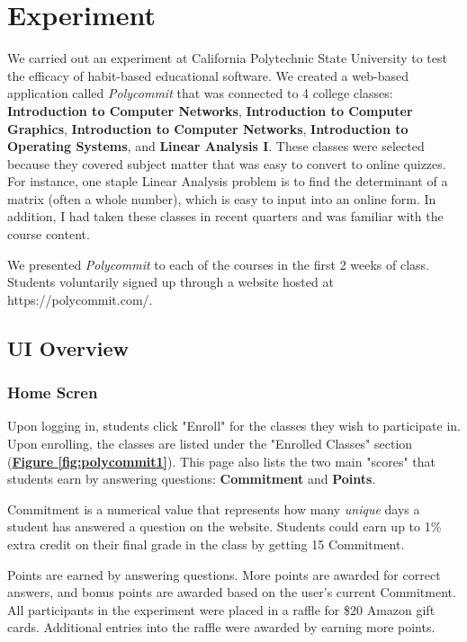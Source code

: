 \chapter{Experiment}

\par We carried out an experiment at California Polytechnic State University to test the efficacy of habit-based educational software. We created a web-based application called \textit{Polycommit} that was connected to 4 college classes: \textbf{Introduction to Computer Networks}, \textbf{Introduction to Computer Graphics}, \textbf{Introduction to Computer Networks}, \textbf{Introduction to Operating Systems}, and \textbf{Linear Analysis I}. These classes were selected because they covered subject matter that was easy to convert to online quizzes. For instance, one staple Linear Analysis problem is to find the determinant of a matrix (often a whole number), which is easy to input into an online form. In addition, I had taken these classes in recent quarters and was familiar with the course content. 

\par We presented \textit{Polycommit} to each of the courses in the first 2 weeks of class. Students voluntarily signed up through a website hosted at https://polycommit.com/.

\section{UI Overview}

\subsection{Home Scren}
\par Upon logging in, students click "Enroll" for the classes they wish to participate in. Upon enrolling, the classes are listed under the "Enrolled Classes" section (\textbf{\hyperref[fig:polycommit1]{Figure \ref*{fig:polycommit1}}}). This page also lists the two main "scores" that students earn by answering questions: \textbf{Commitment} and \textbf{Points}.

\par Commitment is a numerical value that represents how many \textit{unique} days a student has answered a question on the website. Students could earn up to 1\% extra credit on their final grade in the class by getting 15 Commitment.

\par Points are earned by answering questions. More points are awarded for correct answers, and bonus points are awarded based on the user's current Commitment. All participants in the experiment were placed in a raffle for \$20 Amazon gift cards. Additional entries into the raffle were awarded by earning more points.


